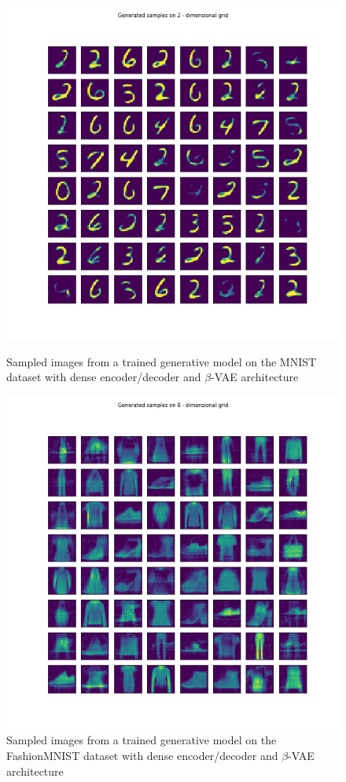 \documentclass[12pt, english]{article}
\begin{document}
\vspace{4mm}

\begin{figure}[ht] 
  \begin{minipage}{0.48\linewidth}
    \centering
    \includegraphics[width=.65\linewidth]{gen/generated_samples_mnist_dense_vae.png}
    \caption{Sampled images from a trained generative model on the MNIST dataset with dense encoder/decoder and $\beta$-VAE architecture}
    \label{fig:sampled-images-1}
  \end{minipage}\hfill
  \begin{minipage}{0.48\linewidth}
    \centering
    \includegraphics[width=.65\linewidth]{gen/generated_samples_fashion_mnist_dense_vae.png} 
    \caption{Sampled images from a trained generative model on the FashionMNIST dataset with dense encoder/decoder and $\beta$-VAE architecture} 
    \label{fig:sampled-images-2}
  \end{minipage} 
\end{figure}
\end{document}
